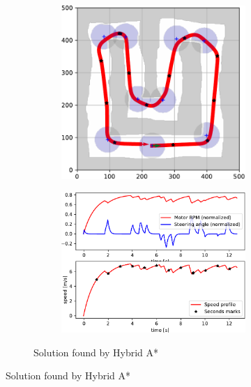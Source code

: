 \begin{figure}[!tbp]%
	\centering

	\begin{subfigure}[t]{\textwidth}
		\begin{subfigure}[t]{0.45\textwidth}
			\includegraphics[width=\textwidth]{../img/experiments/u-hybrid_astar-trajectory}
		\end{subfigure}
		\hfill
		\begin{subfigure}[t]{0.45\textwidth}
			\includegraphics[width=\textwidth]{../img/experiments/u-hybrid_astar-actuators}
		\end{subfigure}	
		\caption{Solution found by Hybrid A*}
		\label{fig:u-hybrid_astar}
	\end{subfigure}


\end{figure}
